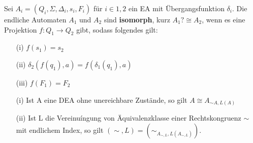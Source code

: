   Sei \(A_{i} = (Q_{i}, \Sigma, \Delta_{i}, s_{i}, F_{i})\) für \(i \in {1,2}\) ein EA mit Übergangsfunktion \(\delta_{i}\). Die endliche Automaten \(A_{1}\) und \(A_{2}\) sind \textbf{isomorph}, kurz \(A_{1}? \cong A_{2}\), wenn es eine Projektion \(f:Q_{1}\rightarrow Q_{2}\) gibt, sodass folgendes gilt:
  \begin{itemize}
    \item [(i)] \(f(s_{1}) = s_{2}\)
    \item [(ii)] \(\delta_{2}(f(q_{1}), a) = f(\delta_{1}(q_{1}), a)\)
    \item [(iii)] \(f(F_1) = F_2\)
  \end{itemize}

  \begin{itemize}
    \item [(i)] Ist A eine DEA ohne unereichbare Zustände, so gilt \(A \cong A_{\sim A, L(A)}\)
    \item [(ii)] Ist L die Vereinuíngung von Äquivalenzklasse einer Rechtskongruenz \(\sim\) mit endlichem Index, so gilt \((\sim, L) = (\sim_{A_{\sim, L}, L(A_{\sim, L})})\).
  \end{itemize}

